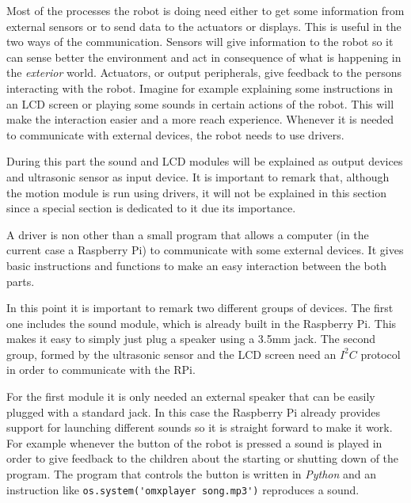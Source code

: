 Most of the processes the robot is doing need either to get some information from external sensors or to send data to the actuators or displays. This is useful in the two ways of the communication. Sensors will give information to the robot so it can sense better the environment and act in consequence of what is happening in the \textit{exterior} world. Actuators, or output peripherals, give feedback to the persons interacting with the robot. Imagine for example explaining some instructions in an LCD screen or playing some sounds in certain actions of the robot. This will make the interaction easier and a more reach experience. Whenever it is needed to communicate with external devices, the robot needs to use drivers.

During this part the sound and LCD modules will be explained as output devices and ultrasonic sensor as input device. It is important to remark that, although the motion module is run using drivers, it will not be explained in this section since a special section is dedicated to it due its importance.

A driver is non other than a small program that allows a computer (in the current case a Raspberry Pi) to communicate with some external devices. It gives basic instructions and functions to make an easy interaction between the both parts.

In this point it is important to remark two different groups of devices. The first one includes the sound module, which is already built in the Raspberry Pi. This makes it easy to simply just plug a speaker using a 3.5mm jack. The second group, formed by the ultrasonic sensor and the LCD screen need an $I^{2}C$ protocol in order to communicate with the RPi.

For the first module it is only needed an external speaker that can be easily plugged with a standard jack. In this case the Raspberry Pi already provides support for launching different sounds so it is straight forward to make it work. For example whenever the button of the robot is pressed a sound is played in order to give feedback to the children about the starting or shutting down of the program. The program that controls the button is written in \textit{Python} and an instruction like \lstinline{os.system('omxplayer song.mp3')} reproduces a sound.

